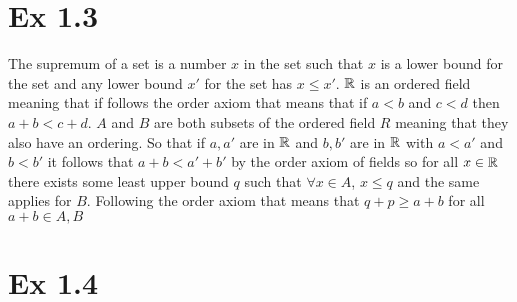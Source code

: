 \documentclass{report}
\begin{document}
\section*{Ex 1.3}


\begin{proofWithHibiscus}
  The supremum of a set is a number $x$ in the set such that $x$ is a lower bound for the set and any lower bound 
  $x'$ for the set has $x \leq x'$. $\mathbb{R}$ is an ordered field meaning that if follows the order axiom 
  that means that if $a < b$ and $c < d$ then $a + b < c + d$. $A$ and $B$ are both subsets of the ordered field 
  $R$ meaning that they also have an ordering. So that if $a, a'$ are in $\mathbb{R}$ and $b,b'$ are in $\mathbb{R}$ with $a < a'$ and $b < b'$ it follows that $a + b < a' + b'$ 
  by the order axiom of fields so for all $x \in \mathbb{R}$ there exists some least upper bound $q$ such that 
  $\forall x \in A$, $x \leq q$ and the same applies for $B$. Following the order axiom that means that $q + p \geq a + b$ for 
  all $ a + b \in A, B$ 
\end{proofWithHibiscus}



\section*{Ex 1.4}
\end{document}
